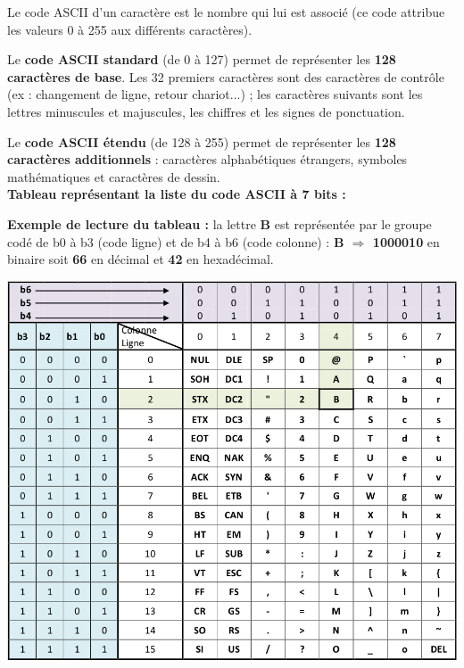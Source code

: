 \documentclass{article}
\begin{document}
Le code ASCII d'un caractère est le nombre qui lui est associé (ce code attribue les valeurs 0 à 255 aux différents caractères).

Le \textbf{code ASCII standard} (de 0 à 127) permet de représenter les \textbf{128 caractères de base}. 
Les 32 premiers caractères sont des caractères de contrôle (ex : changement de ligne, retour chariot...) ;
les caractères suivants sont les lettres minuscules et majuscules, les chiffres et les signes de ponctuation.

Le \textbf{code ASCII étendu} (de 128 à 255) permet de représenter les \textbf{128 caractères additionnels} : caractères alphabétiques
étrangers, symboles mathématiques et caractères de dessin.\\

\textbf{Tableau représentant la liste du code ASCII à 7 bits :}

\textbf{Exemple de lecture du tableau :} la lettre \textbf{B} est représentée par le groupe codé de b0 à b3 (code ligne) et de b4 à b6
(code colonne) : \textbf{B $\Rightarrow$ \color{red}1000010} en binaire soit \textbf{\color{red}66} en décimal et \textbf{\color{red}42} en hexadécimal.

\begin{center}
	\includegraphics[scale=.6]{./figures/ascii1.png}
\end{center}
\newpage
\end{document}
